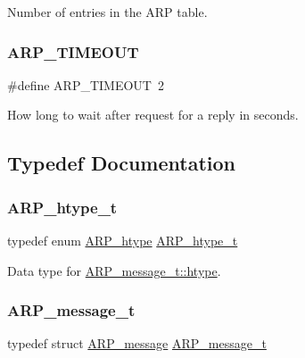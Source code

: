 Number of entries in the A\+RP table. 

\mbox{\label{group__arp_gacadcd25bea19657185a5fcb4f65a7669}} 
\subsubsection{\texorpdfstring{ARP\_TIMEOUT}{ARP\_TIMEOUT}}
{\footnotesize\ttfamily \#define A\+R\+P\+\_\+\+T\+I\+M\+E\+O\+UT~2}



How long to wait after request for a reply in seconds. 



\subsection{Typedef Documentation}
\mbox{\label{group__arp_gafa7086c12e44433aa82abcac54e74242}} 
\subsubsection{\texorpdfstring{ARP\_htype\_t}{ARP\_htype\_t}}
{\footnotesize\ttfamily typedef enum \mbox{\hyperlink{group__arp_gad603463074b00d9c86a9cdb23083f37d}{A\+R\+P\+\_\+htype}}  \mbox{\hyperlink{group__arp_gafa7086c12e44433aa82abcac54e74242}{A\+R\+P\+\_\+htype\+\_\+t}}}



Data type for \mbox{\hyperlink{struct_a_r_p__message_aaf87c38602b614bc7896cf7a5a90d372}{A\+R\+P\+\_\+message\+\_\+t\+::htype}}. 

\mbox{\label{group__arp_ga1708785291f10e8cc257efe2b769ba4c}} 
\subsubsection{\texorpdfstring{ARP\_message\_t}{ARP\_message\_t}}
{\footnotesize\ttfamily typedef struct \mbox{\hyperlink{struct_a_r_p__message}{A\+R\+P\+\_\+message}}  \mbox{\hyperlink{group__arp_ga1708785291f10e8cc257efe2b769ba4c}{A\+R\+P\+\_\+message\+\_\+t}}}



